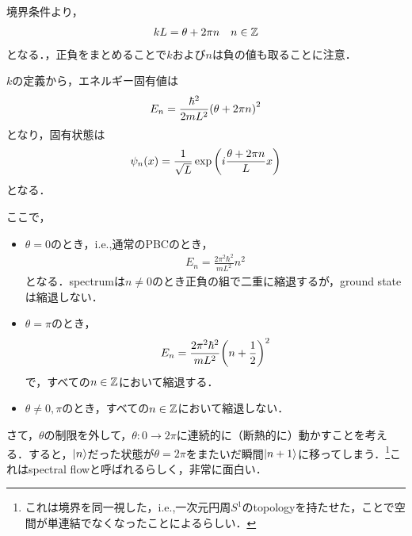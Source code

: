 境界条件より，
\begin{align}
    kL=\theta+2\pi n\quad n\in\mathbb{Z}
\end{align}
となる．，正負をまとめることで$k$および$n$は負の値も取ることに注意．

$k$の定義から，エネルギー固有値は
\begin{align}
    E_n=\frac{\hbar^2}{2mL^2}\qty(\theta+2\pi n)^2
\end{align}
となり，固有状態は
\begin{align}
    \psi_n(x)=\frac{1}{\sqrt{L}}\exp\qty(i\frac{\theta+2\pi n}{L}x)
\end{align}
となる．

ここで，
\begin{itemize}
\item $\theta=0$のとき，i.e.,通常のPBCのとき，
\begin{align}
    E_n=\frac{2\pi^2\hbar^2}{mL^2}n^2
\end{align}
となる．spectrumは$n\neq0$のとき正負の組で二重に縮退するが，ground stateは縮退しない．

\item $\theta=\pi$のとき，
\begin{align}
    E_n=\frac{2\pi^2\hbar^2}{mL^2}\qty(n+\frac{1}{2})^2
\end{align}
で，すべての$n\in\mathbb{Z}$において縮退する．

\item $\theta\neq0,\pi$のとき，すべての$n\in\mathbb{Z}$において縮退しない．
\end{itemize}

さて，$\theta$の制限を外して，$\theta:0\to2\pi$に連続的に（断熱的に）動かすことを考える．すると，$\ket{n}$だった状態が$\theta=2\pi$をまたいだ瞬間$\ket{n+1}$に移ってしまう．\footnote{これは境界を同一視した，i.e.,一次元円周$S^1$のtopologyを持たせた，ことで空間が単連結でなくなったことによるらしい．}これはspectral flowと呼ばれるらしく，非常に面白い．
